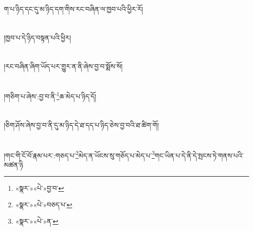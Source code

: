 ག་པ་ཉིད་དང་དུ་མ་ཉིད་དག་གིས་རང་བཞིན་ལ་ཁྱབ་པའི་ཕྱིར་རོ།\chapter{ }།ཁྱབ་པ་དེ་ཉིད་བསྟན་པའི་ཕྱིར།\chapter{ }།རང་བཞིན་ཞིག་ཡོད་པར་གྱུར་ན་ནི་ཞེས་བྱ་བ་སྨོས་སོ།\chapter{ }།གཅིག་པ་ཞེས་:བྱ་བ་ནི་\footnote{«སྣར་»«པེ་»བྱ་བ་}ཆ་མེད་པ་ཉིད་དོ།\chapter{ }།ཅིག་ཤོས་ཞེས་བྱ་བ་ནི་དུ་མ་ཉིད་དེ་ཐ་དད་པ་ཉིད་ཅེས་བྱ་བའི་ཐ་ཚིག་གོ།\chapter{ }།གང་གི་ངོ་བོ་རྣམ་པར་:གཅད་པ་\footnote{«སྣར་»«པེ་»བཅད་པ་}མེད་ན་ཡོངས་སུ་གཅོད་པ་མེད་པ་\footnote{«སྣར་»«པེ་»ན་}གང་ཡིན་པ་དེ་ནི་དེ་སྤངས་ཏེ་གནས་པའི་མཚན་ཉི